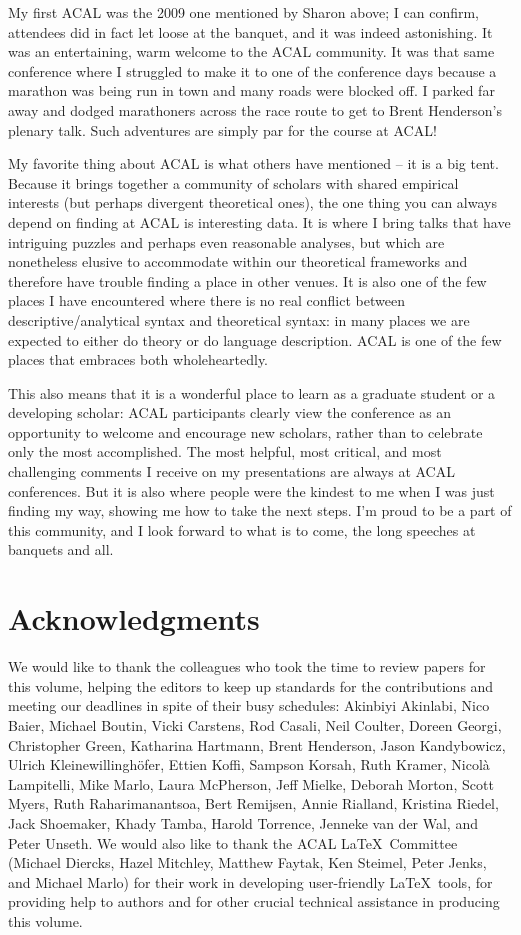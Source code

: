\documentclass[output=paper]{langscibook}
\begin{document}
My first ACAL was the 2009 one mentioned by Sharon above; I can confirm, attendees did in fact let loose at the banquet, and it was indeed astonishing. It was an entertaining, warm welcome to the ACAL community. It was that same conference where I struggled to make it to one of the conference days because a marathon was being run in town and many roads were blocked off. I parked far away and dodged marathoners across the race route to get to Brent Henderson’s plenary talk. Such adventures are simply par for the course at ACAL!
 
My favorite thing about ACAL is what others have mentioned -- it is a big tent. Because it brings together a community of scholars with shared empirical interests (but perhaps divergent theoretical ones), the one thing you can always depend on finding at ACAL is interesting data. It is where I bring talks that have intriguing puzzles and perhaps even reasonable analyses, but which are nonetheless elusive to accommodate within our theoretical frameworks and therefore have trouble finding a place in other venues. It is also one of the few places I have encountered where there is no real conflict between descriptive/analytical syntax and theoretical syntax: in many places we are expected to either do theory or do language description. ACAL is one of the few places that embraces both wholeheartedly.  
 
This also means that it is a wonderful place to learn as a graduate student or a developing scholar: ACAL participants clearly view the conference as an opportunity to welcome and encourage new scholars, rather than to celebrate only the most accomplished. The most helpful, most critical, and most challenging comments I receive on my presentations are always at ACAL conferences. But it is also where people were the kindest to me when I was just finding my way, showing me how to take the next steps. I’m proud to be a part of this community, and I look forward to what is to come, the long speeches at banquets and all. 

\section*{Acknowledgments}

We would like to thank the colleagues who took the time to review papers for this volume, helping the editors to keep up standards for the contributions and meeting our deadlines in spite of their busy schedules: Akinbiyi Akinlabi, Nico Baier, Michael Boutin, Vicki Carstens, Rod Casali, Neil Coulter, Doreen Georgi, Christopher Green, Katharina Hartmann, Brent Henderson, Jason Kandybowicz, Ulrich Kleinewillinghöfer, Ettien Koffi, Sampson Korsah, Ruth Kramer, Nicolà Lampitelli, Mike Marlo, Laura McPherson, Jeff Mielke, Deborah Morton, Scott Myers, Ruth Raharimanantsoa, Bert Remijsen, Annie Rialland, Kristina Riedel, Jack Shoemaker, Khady Tamba, Harold Torrence, Jenneke van der Wal, and Peter Unseth. We would also like to thank the ACAL \LaTeX\ Committee (Michael Diercks, Hazel Mitchley, Matthew Faytak, Ken Steimel, Peter Jenks, and Michael Marlo) for their work in developing user-friendly \LaTeX\ tools, for providing help to authors and for other crucial technical assistance in producing this volume.

{\sloppy\printbibliography[heading=subbibliography,notkeyword=this]}
\end{document}
